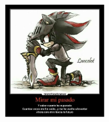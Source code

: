 \vfill %


\begin{figure}[h!] %
    \centering %
    \includegraphics[width=0.4\textwidth]{img/ShadowCavaleiro.jpeg} %
    \label{fig:myimage} %
\end{figure}